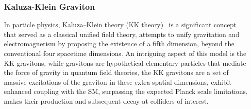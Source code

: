 \documentclass[UTF8,12pt]{ctexart}
\numberwithin{equation}{section}
\def\to{\rightarrow}
\begin{document}
%
%
%
%
%

\subsubsection{Kaluza-Klein Graviton}
In particle physics, Kaluza–Klein theory (KK theory)~\cite{Klein:1926tv} is a significant concept that served as a classical unified field theory, attempts to unify gravitation and electromagnetism by proposing the existence of a fifth dimension, beyond the conventional four spacetime dimensions.  An intriguing aspect of this model is the KK gravitons, while gravitons are hypothetical elementary particles that mediate the force of gravity in quantum field theories, the KK gravitons are a set of massive excitations of the graviton in these extra spatial dimensions, exhibit enhanced coupling with the SM, surpassing the expected Planck scale limitations, makes their production and subsequent decay at colliders of interest. 
\end{document}
